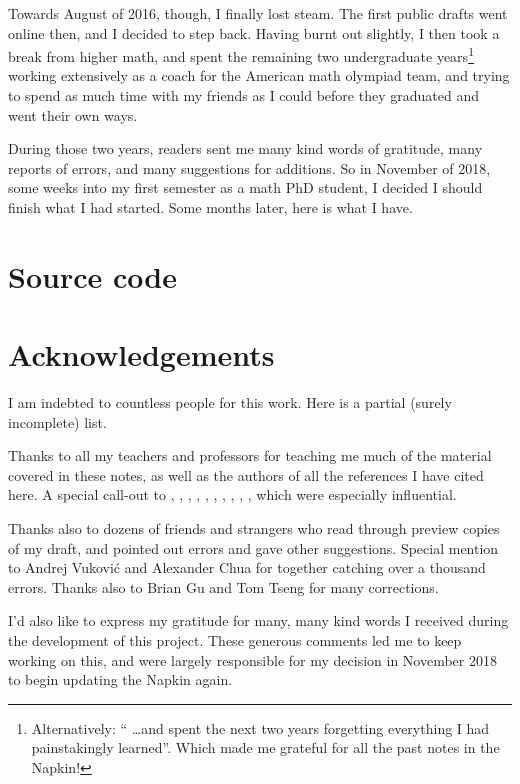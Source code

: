 Towards August of 2016, though, I finally lost steam.
The first public drafts went online then, and I decided to step back.
Having burnt out slightly,
I then took a break from higher math,
and spent the remaining two undergraduate years\footnote{Alternatively:
	`` \dots and spent the next two years forgetting everything
	I had painstakingly learned''.
	Which made me grateful for all the past notes in the Napkin!}
working extensively as a coach for the American math olympiad team,
and trying to spend as much time with my friends as I could
before they graduated and went their own ways.

During those two years, readers sent me many kind words of gratitude,
many reports of errors, and many suggestions for additions.
So in November of 2018,
some weeks into my first semester as a math PhD student,
I decided I should finish what I had started.
Some months later, here is what I have.

\section*{Source code}


\section*{Acknowledgements}
I am indebted to countless people for this work.
Here is a partial (surely incomplete) list.

\begin{itemize}
\ii Thanks to all my teachers and professors for teaching me much of the
material covered in these notes,
as well as the authors of all the references I have cited here.
A special call-out to \cite{ref:55a}, \cite{ref:msci},
\cite{ref:manifolds}, \cite{ref:gathmann}, \cite{ref:18-435},
\cite{ref:etingof}, \cite{ref:145a}, \cite{ref:vakil},
\cite{ref:pugh}, \cite{ref:gorin},
which were especially influential.

\ii Thanks also to dozens of friends and strangers
who read through preview copies of my draft,
and pointed out errors and gave other suggestions.
Special mention to Andrej Vukovi\'c and Alexander Chua
for together catching over a thousand errors.
Thanks also to Brian Gu and Tom Tseng for many corrections.

\ii I'd also like to express my gratitude for
many, many kind words I received
during the development of this project.
These generous comments led me to keep working on this,
and were largely responsible for my decision in November 2018
to begin updating the Napkin again.
\end{itemize}

